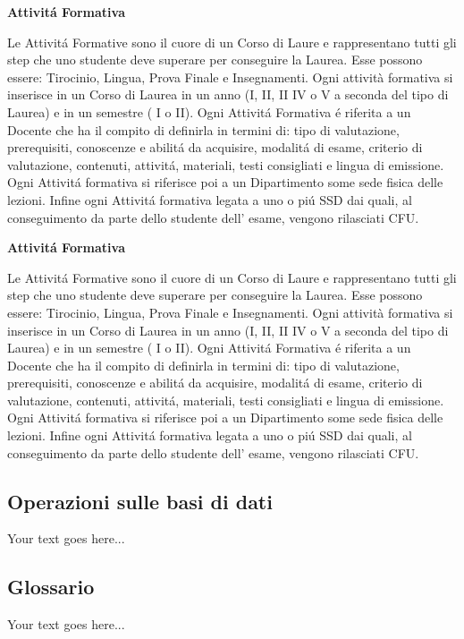 \documentclass[a4paper,12pt,italian,towside]{article}
\begin{document}
\textbf{Attivit\'a Formativa}
\par
\textcolor{red!50} {Le Attivit\'a Formative sono il cuore di un Corso di Laure e rappresentano tutti gli step che uno studente deve superare per conseguire la Laurea. Esse possono essere: Tirocinio, Lingua, Prova Finale e Insegnamenti. Ogni attività formativa si inserisce in un Corso di Laurea in un anno (I, II, II IV o V a seconda del tipo di Laurea) e in un semestre ( I o II). Ogni Attivit\'a Formativa \'e riferita a un Docente che ha il compito di definirla in termini di: tipo di valutazione, prerequisiti, conoscenze e abilit\'a da acquisire, modalit\'a di esame, criterio di valutazione, contenuti, attivit\'a, materiali, testi consigliati e lingua di emissione. Ogni Attivit\'a formativa si riferisce poi a un Dipartimento some sede fisica delle lezioni. Infine ogni Attivit\'a formativa  legata a uno o pi\'u SSD dai quali, al conseguimento da parte dello studente dell' esame, vengono rilasciati CFU.
} 

\textbf{Attivit\'a Formativa}
\par
\textcolor{red!50} {Le Attivit\'a Formative sono il cuore di un Corso di Laure e rappresentano tutti gli step che uno studente deve superare per conseguire la Laurea. Esse possono essere: Tirocinio, Lingua, Prova Finale e Insegnamenti. Ogni attività formativa si inserisce in un Corso di Laurea in un anno (I, II, II IV o V a seconda del tipo di Laurea) e in un semestre ( I o II). Ogni Attivit\'a Formativa \'e riferita a un Docente che ha il compito di definirla in termini di: tipo di valutazione, prerequisiti, conoscenze e abilit\'a da acquisire, modalit\'a di esame, criterio di valutazione, contenuti, attivit\'a, materiali, testi consigliati e lingua di emissione. Ogni Attivit\'a formativa si riferisce poi a un Dipartimento some sede fisica delle lezioni. Infine ogni Attivit\'a formativa  legata a uno o pi\'u SSD dai quali, al conseguimento da parte dello studente dell' esame, vengono rilasciati CFU.
} 



\subsection{Operazioni sulle basi di dati}

Your text goes here...

\subsection{Glossario}
Your text goes here...
\end{document}
